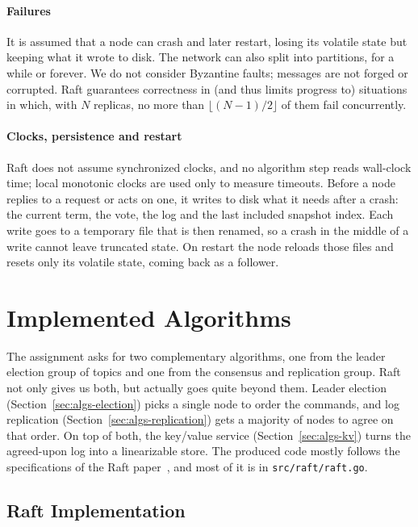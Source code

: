 \documentclass[conference]{IEEEtran}
\begin{document}
\paragraph{Failures}
It is assumed that a node can crash and later restart, losing its volatile state but keeping what it wrote to disk. The network can also split into partitions, for a while or forever. We do not consider Byzantine faults; messages are not forged or corrupted. Raft guarantees correctness in (and thus limits progress to) situations in which, with $N$ replicas, no more than $\lfloor (N-1)/2 \rfloor$ of them fail concurrently.

\paragraph{Clocks, persistence and restart}
Raft does not assume synchronized clocks, and no algorithm step reads wall-clock time; local monotonic clocks are used only to measure timeouts.  Before a node replies to a request or acts on one, it writes to disk what it needs after a crash: the current term, the vote, the log and the last included snapshot index.  Each write goes to a temporary file that is then renamed, so a crash in the middle of a write cannot leave truncated state.  On restart the node reloads those files and resets only its volatile state, coming back as a follower.

\section{Implemented Algorithms}
\label{sec:algs}

The assignment asks for two complementary algorithms, one from the leader election group of topics and one from the consensus and replication group. Raft not only gives us both, but actually goes quite beyond them. Leader election (Section~\ref{sec:algs-election}) picks a single node to order the commands, and log replication (Section~\ref{sec:algs-replication}) gets a majority of nodes to agree on that order. On top of both, the key/value service (Section~\ref{sec:algs-kv}) turns the agreed-upon log into a linearizable store. The produced code mostly follows the specifications of the Raft paper~\cite{raft2014}, and most of it is in \texttt{src/raft/raft.go}.

\subsection{Raft Implementation}
\end{document}

